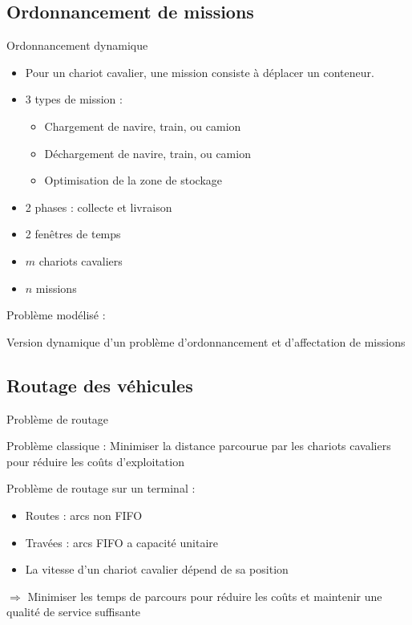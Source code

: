 \documentclass{beamer}
\begin{document}
    \subsection{Ordonnancement de missions}
\begin{frame}{Ordonnancement dynamique}
 \begin{itemize}   
   \item Pour un chariot cavalier, une mission consiste à déplacer un conteneur.
   \pause
    \item 3 types de mission : 
    \begin{itemize}
      \item Chargement de navire, train, ou camion
      \item Déchargement de navire, train, ou camion
      \item Optimisation de la zone de stockage
    \end{itemize}
    \pause
    \item 2 phases : collecte et livraison
    \pause
    \item 2 fenêtres de temps 
    \pause
    \item $m$ chariots cavaliers
    \item $n$ missions
\end{itemize}
\pause
\begin{block}{ Problème modélisé : }
   	\begin{minipage}[]{\columnwidth}
		Version dynamique d'un problème d'ordonnancement et d'affectation de missions
	\end{minipage}
  \end{block}
  \end{frame}
\subsection{Routage des véhicules}
\begin{frame}{Problème de routage}
    \begin{block}{Problème classique : }
      Minimiser la distance parcourue par les chariots cavaliers pour réduire les coûts d'exploitation
    \end{block}
\pause
    \begin{block}{Problème de routage sur un terminal :}
       \begin{itemize} 
	  \item Routes : arcs non FIFO
	  \item Travées : arcs FIFO a capacité unitaire
	  \item La vitesse d'un chariot cavalier dépend de sa position
	
	\end{itemize}
	\pause
	\begin{center}
	    $\Rightarrow$ Minimiser les temps de parcours pour réduire les coûts et maintenir une qualité de service suffisante	  
	  \end{center}
    \end{block}
  \end{frame}
\end{document}
